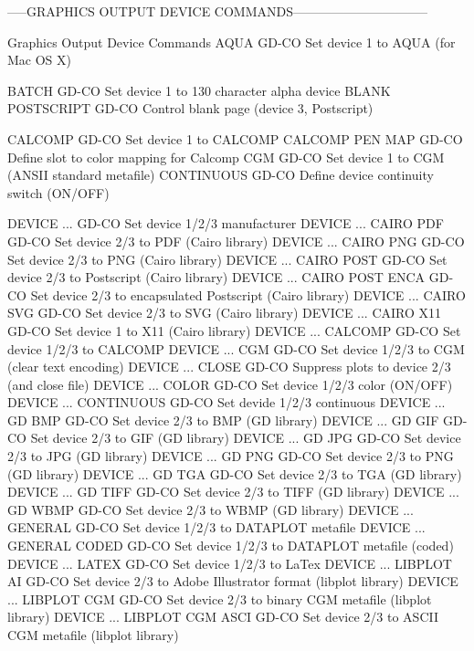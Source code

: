 -----GRAPHICS OUTPUT DEVICE COMMANDS--------------------------------

Graphics Output Device Commands
AQUA                        GD-CO Set device 1 to AQUA (for Mac OS X)

BATCH                       GD-CO Set device 1 to 130 character alpha device
BLANK POSTSCRIPT            GD-CO Control blank page (device 3, Postscript)

CALCOMP                     GD-CO Set device 1 to CALCOMP
CALCOMP PEN MAP             GD-CO Define slot to color mapping for Calcomp
CGM                         GD-CO Set device 1 to CGM (ANSII standard metafile)
CONTINUOUS                  GD-CO Define device continuity switch (ON/OFF)

DEVICE ...                  GD-CO Set device 1/2/3 manufacturer
DEVICE ... CAIRO PDF        GD-CO Set device 2/3 to PDF (Cairo library)
DEVICE ... CAIRO PNG        GD-CO Set device 2/3 to PNG (Cairo library)
DEVICE ... CAIRO POST       GD-CO Set device 2/3 to Postscript (Cairo library)
DEVICE ... CAIRO POST ENCA  GD-CO Set device 2/3 to encapsulated Postscript (Cairo library)
DEVICE ... CAIRO SVG        GD-CO Set device 2/3 to SVG (Cairo library)
DEVICE ... CAIRO X11        GD-CO Set device 1 to X11 (Cairo library)
DEVICE ... CALCOMP          GD-CO Set device 1/2/3 to CALCOMP
DEVICE ... CGM              GD-CO Set device 1/2/3 to CGM (clear text encoding)
DEVICE ... CLOSE            GD-CO Suppress plots to device 2/3 (and close file)
DEVICE ... COLOR            GD-CO Set device 1/2/3 color (ON/OFF)
DEVICE ... CONTINUOUS       GD-CO Set devide 1/2/3 continuous
DEVICE ... GD BMP           GD-CO Set device 2/3 to BMP (GD library)
DEVICE ... GD GIF           GD-CO Set device 2/3 to GIF (GD library)
DEVICE ... GD JPG           GD-CO Set device 2/3 to JPG (GD library)
DEVICE ... GD PNG           GD-CO Set device 2/3 to PNG (GD library)
DEVICE ... GD TGA           GD-CO Set device 2/3 to TGA (GD library)
DEVICE ... GD TIFF          GD-CO Set device 2/3 to TIFF (GD library)
DEVICE ... GD WBMP          GD-CO Set device 2/3 to WBMP (GD library)
DEVICE ... GENERAL          GD-CO Set device 1/2/3 to DATAPLOT metafile
DEVICE ... GENERAL CODED    GD-CO Set device 1/2/3 to DATAPLOT metafile (coded)
DEVICE ... LATEX            GD-CO Set device 1/2/3 to LaTex
DEVICE ... LIBPLOT AI       GD-CO Set device 2/3 to Adobe Illustrator format (libplot library)
DEVICE ... LIBPLOT CGM      GD-CO Set device 2/3 to binary CGM metafile (libplot library)
DEVICE ... LIBPLOT CGM ASCI GD-CO Set device 2/3 to ASCII CGM metafile (libplot library)
